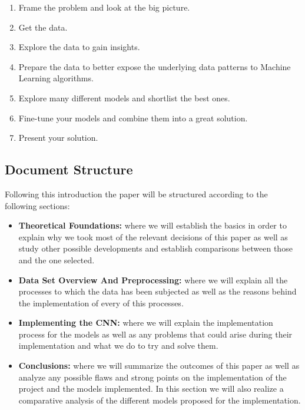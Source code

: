 \documentclass[12pt, a4paper]{article}
\begin{document}
	 \begin{enumerate}
	 	\item Frame the problem and look at the big picture.
	 	
	 	\item Get the data.
	 	
	 	\item Explore the data to gain insights.
	 	
	 	\item Prepare the data to better expose the underlying data patterns to Machine Learning algorithms.
	 	
	 	\item Explore many different models and shortlist the best ones.
	 	
	 	\item Fine-tune your models and combine them into a great solution.
	 	
	 	\item Present your solution.
	 \end{enumerate}
	
	
	\clearpage
	
	\subsection{Document Structure}
	
	Following this introduction the paper will be structured according to the following sections:
	
	\begin{itemize}
		
		
		\item \textbf{Theoretical Foundations:} where we will establish the basics in order to explain why we took most of the relevant decisions of this paper as well as study other possible developments and establish comparisons between those and the one selected.
		
		\item \textbf{Data Set Overview And Preprocessing:} where we will explain all the processes to which the data has been subjected as well as the reasons behind the implementation of every of this processes.
		
		\item \textbf{Implementing the CNN:} where we will explain the implementation process for the models as well as any problems that could arise during their implementation and what we do to try and solve them.
		
		\item \textbf{Conclusions:} where we will summarize the outcomes of this paper as well as analyze any possible flaws and strong points on the implementation of the project and the models implemented. In this section we will also realize a comparative analysis of the different models proposed for the implementation.
		
		
	\end{itemize}
\end{document}
